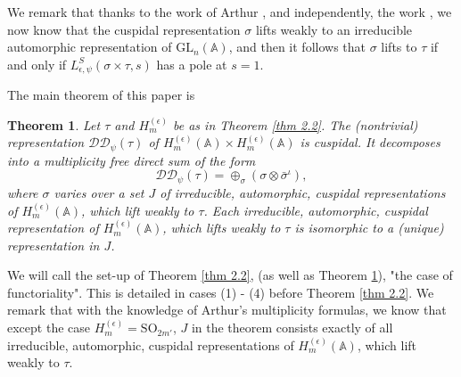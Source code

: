 \documentclass[12pts]{amsart}
\newcommand{\BA}{{\mathbb {A}}}
\newcommand{\GL}{{\mathrm{GL}}}
\newcommand{\SO}{{\mathrm{SO}}}
\newtheorem{thm}{Theorem}[section]
\begin{document}
We remark that thanks to the work of Arthur \cite{A13}, and independently, the work \cite{CFK18}, we now know that the cuspidal representation $\sigma$ lifts weakly to an irreducible automorphic representation of $\GL_n(\BA)$, and then it follows that $\sigma$ lifts to $\tau$ if and only if $L^S_{\epsilon,\psi}(\sigma \times \tau,s)$ has a pole at $s=1$. 

The main theorem of this paper is
\begin{thm}\label{thm 2.4} 
Let $\tau$ and $H^{(\epsilon)}_m$ be as in Theorem \ref{thm 2.2}. The (nontrivial) representation $\mathcal{D}\mathcal{D}_\psi(\tau)$ of $H^{(\epsilon)}_m(\BA)\times H^{(\epsilon)}_m(\BA)$ is cuspidal. It decomposes into a multiplicity free direct sum of the form
\begin{equation}\label{2.2.1}
\mathcal{D}\mathcal{D}_\psi(\tau)=\oplus_\sigma (\sigma\otimes \bar{\sigma}^\iota),
\end{equation}
where $\sigma$ varies over a set $J$ of irreducible, automorphic, cuspidal representations of $H^{(\epsilon)}_m(\BA)$, which lift weakly to $\tau$. Each irreducible, automorphic, cuspidal representation of $H^{(\epsilon)}_m(\BA)$, which lifts weakly to $\tau$ is isomorphic to a (unique) representation in $J$.
\end{thm}
We will call the set-up of Theorem \ref{thm 2.2}, (as well as Theorem \ref{thm 2.4}), "the case of functoriality". This is detailed in cases (1) - (4) before Theorem \ref{thm 2.2}.
We remark that with the knowledge of Arthur's multiplicity formulas, we know that except the case $H^{(\epsilon)}_m=\SO_{2m'}$, $J$ in the theorem consists exactly of all irreducible, automorphic, cuspidal representations of $H^{(\epsilon)}_m(\BA)$, which lift weakly to $\tau$. 
\end{document}
